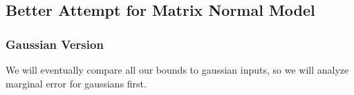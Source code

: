 \documentclass{article}
\newcommand{\E}{\mathbb{E}}
\begin{document}




\subsection{Better Attempt for Matrix Normal Model}

\subsubsection{Gaussian Version}
We will eventually compare all our bounds to gaussian inputs, so we will analyze marginal error for gaussians first. 
\end{document}
